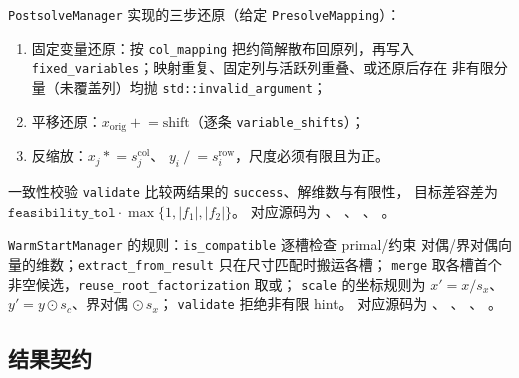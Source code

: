 \texttt{PostsolveManager} 实现的三步还原（给定 \texttt{PresolveMapping}）：
\begin{enumerate}
  \item 固定变量还原：按 \texttt{col\_mapping} 把约简解散布回原列，再写入
        \texttt{fixed\_variables}；映射重复、固定列与活跃列重叠、或还原后存在
        非有限分量（未覆盖列）均抛 \texttt{std::invalid\_argument}；
  \item 平移还原：$x_{\mathrm{orig}} \mathrel{+}= \mathrm{shift}$（逐条
        \texttt{variable\_shifts}）；
  \item 反缩放：$x_j \mathrel{*}= s^{\mathrm{col}}_j$、
        $y_i \mathrel{/}= s^{\mathrm{row}}_i$，尺度必须有限且为正。
\end{enumerate}
一致性校验 \texttt{validate} 比较两结果的 \texttt{success}、解维数与有限性，
目标差容差为 $\texttt{feasibility\_tol}\cdot\max\{1,|f_1|,|f_2|\}$。
对应源码为
、
、
、
。

\texttt{WarmStartManager} 的规则：\texttt{is\_compatible} 逐槽检查 primal/约束
对偶/界对偶向量的维数；\texttt{extract\_from\_result} 只在尺寸匹配时搬运各槽；
\texttt{merge} 取各槽首个非空候选，\texttt{reuse\_root\_factorization} 取或；
\texttt{scale} 的坐标规则为 $x'=x/s_x$、$y'=y\odot s_c$、界对偶 $\odot\, s_x$；
\texttt{validate} 拒绝非有限 hint。
对应源码为
、
、
、
。

\subsection{结果契约}\label{subsec:api-result}

